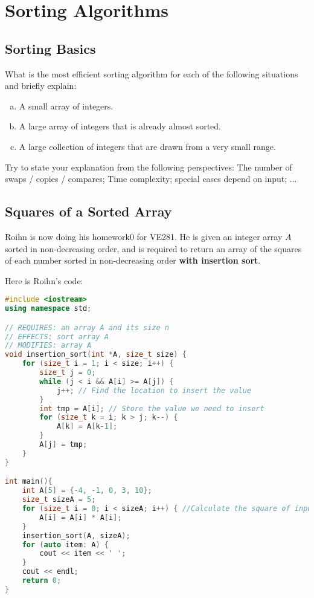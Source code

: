 \documentclass[11pt]{exam}
\begin{document}
\section{Sorting Algorithms}

\subsection{Sorting Basics}
What is the most efficient sorting algorithm for each of the following situations and briefly explain:
\begin{enumerate}[(a)]
\item A small array of integers.
\item A large array of integers that is already almost sorted.
\item A large collection of integers that are drawn from a very small range.
\end{enumerate}
Try to state your explanation from the following perspectives: The number of swaps / copies / compares; Time complexity; special cases depend on input; ...
\begin{solution}
\end{solution}

\subsection{Squares of a Sorted Array}
Roihn is now doing his homework0 for VE281. He is given an integer array $A$ sorted in non-decreasing order, and is required to return an array of the squares of each number sorted in non-decreasing order \textbf{with insertion sort}.

Here is Roihn's code:
\begin{lstlisting}[language=c++]
#include <iostream>
using namespace std;

// REQUIRES: an array A and its size n
// EFFECTS: sort array A
// MODIFIES: array A
void insertion_sort(int *A, size_t size) {
    for (size_t i = 1; i < size; i++) {
        size_t j = 0;
        while (j < i && A[i] >= A[j]) {
            j++; // Find the location to insert the value
        }
        int tmp = A[i]; // Store the value we need to insert
        for (size_t k = i; k > j; k--) {
            A[k] = A[k-1];
        }
        A[j] = tmp;
    }
}

int main(){
    int A[5] = {-4, -1, 0, 3, 10};
    size_t sizeA = 5;
    for (size_t i = 0; i < sizeA; i++) { //Calculate the square of input array
        A[i] = A[i] * A[i];
    }
    insertion_sort(A, sizeA);
    for (auto item: A) {
        cout << item << ' ';
    }
    cout << endl;
    return 0;
}
\end{lstlisting}
\end{document}
